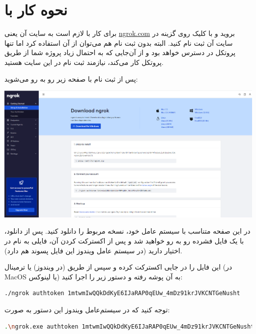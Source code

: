 \documentclass[]{article}
\begin{document}
 


\newpage

\section*{{\titr نحوه کار با }}

برای کار با  لازم است به سایت آن یعنی 
 \href{ngrok.com}{ngrok.com}
 بروید و با کلیک روی گزینه  در سایت آن ثبت نام کنید. البته بدون ثبت نام هم می‌توان از آن استفاده کرد اما تنها پروتکل  در دسترس خواهد بود و از آن‌جایی که به احتمال زیاد پروژه شما از طریق پروتکل  کار می‌کند، نیازمند ثبت نام در این سایت هستید.
 
 پس از ثبت نام با صفحه زیر رو به رو می‌شوید:
 
 \begin{center}
 	\includegraphics[width = 1.0 \textwidth]{images/1.png}
 \end{center}

در این صفحه متناسب با سیستم عامل خود، نسخه مربوط را دانلود کنید. پس از دانلود، با یک فایل فشرده رو به رو خواهید شد و پس از اکسترکت کردن آن، فایلی به نام  در اختیار دارید (در سیستم عامل ویندوز این فایل پسوند   هم دارد).

این فایل را در جایی اکسترکت کرده و سپس از طریق  (در ویندوز) یا ترمینال (در MacOS یا لینوکس) به آن پوشه رفته و دستور زیر را اجرا کنید:
\begin{latin}
\begin{lstlisting}[language = bash]
./ngrok authtoken 1mtwmIwQQkDdKyE6IJaRAP0qEUw_4mDz91krJVKCNTGeNusht
\end{lstlisting}
\end{latin}
توجه کنید که در سیستم‌عامل ویندوز این دستور به صورت:

\begin{latin}
\begin{lstlisting}[language = bash]
.\ngrok.exe authtoken 1mtwmIwQQkDdKyE6IJaRAP0qEUw_4mDz91krJVKCNTGeNusht
\end{lstlisting}
\end{latin}
\end{document}
